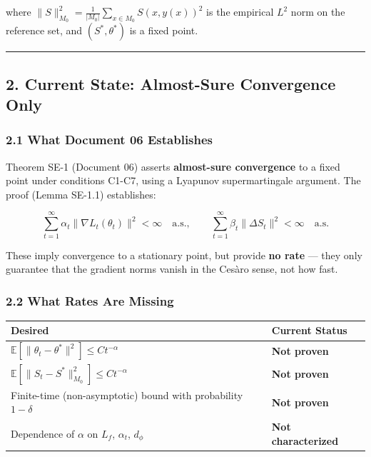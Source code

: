 \documentclass[
  12pt,
]{article}
\begin{document}
where \(\|S\|_{M_0}^2 = \frac{1}{|M_0|}\sum_{x \in M_0} S(x, y(x))^2\)
is the empirical \(L^2\) norm on the reference set, and
\((S^*, \theta^*)\) is a fixed point.

\begin{center}\rule{0.5\linewidth}{0.5pt}\end{center}

\subsection{2. Current State: Almost-Sure Convergence
Only}\label{current-state-almost-sure-convergence-only}

\subsubsection{2.1 What Document 06
Establishes}\label{what-document-06-establishes}

Theorem SE-1 (Document 06) asserts \textbf{almost-sure convergence} to a
fixed point under conditions C1-C7, using a Lyapunov supermartingale
argument. The proof (Lemma SE-1.1) establishes:

\[\sum_{t=1}^\infty \alpha_t \|\nabla L_t(\theta_t)\|^2 < \infty \quad \text{a.s.}, \qquad \sum_{t=1}^\infty \beta_t \|\Delta S_t\|^2 < \infty \quad \text{a.s.}\]

These imply convergence to a stationary point, but provide \textbf{no
rate} --- they only guarantee that the gradient norms vanish in the
Cesàro sense, not how fast.

\subsubsection{2.2 What Rates Are Missing}\label{what-rates-are-missing}

\begin{longtable}[]{@{}
  >{\raggedright\arraybackslash}p{}
  >{\raggedright\arraybackslash}p{}@{}}
\toprule\noalign{}
\begin{minipage}[b]{\linewidth}\raggedright
Desired
\end{minipage} & \begin{minipage}[b]{\linewidth}\raggedright
Current Status
\end{minipage} \\
\midrule\noalign{}
\endhead
\bottomrule\noalign{}
\endlastfoot
\(\mathbb{E}[\|\theta_t - \theta^*\|^2] \leq C t^{-\alpha}\) &
\textbf{Not proven} \\
\(\mathbb{E}[\|S_t - S^*\|_{M_0}^2] \leq C t^{-\alpha}\) & \textbf{Not
proven} \\
Finite-time (non-asymptotic) bound with probability \(1-\delta\) &
\textbf{Not proven} \\
Dependence of \(\alpha\) on \(L_f\), \(\alpha_t\), \(d_\phi\) &
\textbf{Not characterized} \\
\end{longtable}
\end{document}
